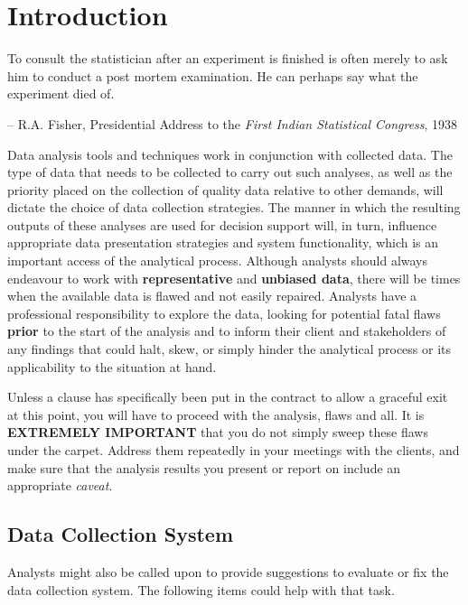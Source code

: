 \newpage\section{Introduction}
\begin{tcolorbox}[title=Fisher's Maxim]
To consult the statistician after an experiment is finished is often merely to ask him to conduct a post mortem examination. He can perhaps say what the experiment died of. \\[-0.6cm]
\begin{flushright}
-- R.A. Fisher, Presidential Address to the \textit{First Indian Statistical Congress}, 1938
\end{flushright}
\end{tcolorbox}
\noindent Data analysis tools and techniques work in conjunction with collected data. The type of data that needs to be collected to carry out such analyses, as well as the priority placed on the collection of quality data relative to other demands, will dictate the choice of data collection strategies. The manner in which the resulting outputs of these analyses are used for decision support will, in turn, influence appropriate data presentation strategies and system functionality, which is an important access of the analytical process.  
\newl Although analysts should always endeavour to work with \textbf{representative} and \textbf{unbiased data}, there will be times when the available data is flawed and not easily repaired. Analysts have a professional responsibility to explore the data, looking for potential fatal flaws \textbf{prior} to  the start of the analysis and to inform their client and stakeholders of any findings that could halt, skew, or simply hinder the analytical process or its applicability to the situation at hand. 
\par Unless a clause has specifically been put in the contract to allow a graceful exit at this point, you will have to proceed with the analysis, flaws and all. It is  \textbf{EXTREMELY IMPORTANT} that you do not simply sweep these flaws under the carpet. Address them repeatedly in your meetings with the clients, and make sure that  the analysis results you present or report on include an appropriate \textit{caveat}. \subsection{Data Collection System} Analysts might also be called upon to provide suggestions to evaluate or fix the data collection system. The following items could help with that task. 
